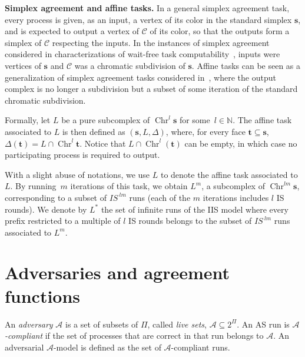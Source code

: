 \documentclass[a4paper]{article}
\newcommand{\myparagraph}[1]{\vspace{6pt}\noindent \textbf{#1}}
\def\A{\ensuremath{\mathcal{A}}}
\def\C{\ensuremath{\mathcal{C}}}
\def\s {\mathbf{s}}
\def\t {\mathbf{t}}
\def\Chr{\operatorname{Chr}}
\def\IS{\textit{IS}}
\begin{document}
\myparagraph{Simplex agreement and affine tasks.}
In a general simplex agreement task, every process is given, as an
input, a vertex of its color in the standard simplex $\s$, and is
expected to output a vertex of $\C$ of its color, so that the outputs
form a simplex of $\C$ respecting the inputs.   
In the instances of simplex agreement considered in characterizations
of wait-free task computability~\cite{BG97,HS99}, inputs were vertices
of $\s$ and $\C$ was a chromatic subdivision of $\s$.
%
Affine tasks can be seen as a generalization of simplex agreement
tasks considered in~\cite{BG97,HS99}, where the output 
complex is no longer a subdivision but a subset of some 
iteration of the standard chromatic subdivision.

Formally, let $L$ be a pure subcomplex of $\Chr^l\s$ for some~$l\in \mathbb{N}$.
The affine task associated to $L$ is then defined as $(\s,L,\Delta)$, 
where, for every face 
$\t \subseteq \s$, $\Delta(\t) = L \cap \Chr^l \t$.
Notice that $L \cap \Chr^l(\t)$ can be empty, in which case no
participating process is required to output.

With a slight abuse of 
notations, we use $L$ to denote the affine task 
associated to $L$. 
By running~$m$ iterations of this task, we obtain $L^m$, a 
subcomplex of $\Chr^{lm}\s$, corresponding to a subset of 
$\IS^{~lm}$ runs (each of the $m$ iterations includes $l$ IS rounds). We 
denote by $L^*$ the set of infinite runs of the IIS model where 
every prefix restricted to a multiple of $l$ IS rounds 
belongs to the subset of $\IS^{~lm}$ runs associated to $L^m$.

\section{Adversaries and agreement functions}
\label{sec:adv}

An \emph{adversary} $\A$ is a set of subsets of $\Pi$, called \emph{live sets}, $\A\subseteq 2^{\Pi}$.
%
%
An AS run is \emph{$\A$-compliant} if the set of processes that are correct in that run
belongs to $\A$. An adversarial $\A$-model is defined as the set of
$\A$-compliant runs. 
\end{document}
